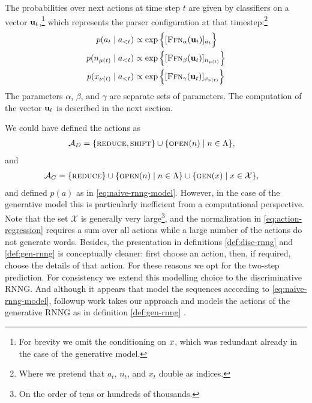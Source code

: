     The probabilities over next actions at time step $t$ are given by classifiers on a vector $\mathbf{u}_t$,\footnote{For brevity we omit the conditioning on $x$, which was redundant already in the case of the generative model.} which represents the parser configuration at that timestep:\footnote{Where we pretend that $a_t$, $n_t$, and $x_t$ double as indices.}
    \begin{align}
      p(a_t \mid a_{<t})
        &\propto \exp \Big\{ [\textsc{Ffn}_{\alpha}( \mathbf{u}_t )]_{a_t}  \Big\}  \\
      p(n_{\mu(t)} \mid a_{<t})
        &\propto \exp \Big\{ [\textsc{Ffn}_{\beta}( \mathbf{u}_t )]_{n_{\mu(t)}}  \Big\}  \\
      p(x_{\nu(t)} \mid a_{<t})
        &\propto \exp \Big\{ [\textsc{Ffn}_{\gamma}( \mathbf{u}_t )]_{x_{\nu(t)}}  \Big\}
      \label{eq:action-regression}
    \end{align}
    The parameters $\alpha$, $\beta$, and $\gamma$ are separate sets of parameters. The computation of the vector $\mathbf{u}_t$ is described in the next section.

    \begin{remark} We could have defined the actions as
      \begin{align*}
        \mathcal{A}_D &= \{ \textsc{reduce}, \textsc{shift} \} \cup \{ \textsc{open}(n) \mid n \in \Lambda \},
      \end{align*}
      and
      \begin{align*}
        \mathcal{A}_G &= \{ \textsc{reduce} \} \cup \{ \textsc{open}(n) \mid n \in \Lambda \} \cup \{ \textsc{gen}(x) \mid x \in \mathcal{X} \},
      \end{align*}
      and defined $p(a)$ as in \ref{eq:naive-rnng-model}. However, in the case of the generative model this is particularly inefficient from a computational perspective. Note that the set $\mathcal{X}$ is generally very large\footnote{On the order of tens or hundreds of thousands.}, and the normalization in \ref{eq:action-regression} requires a sum over all actions while a large number of the actions do not generate words. Besides, the presentation in definitions \ref{def:disc-rnng} and \ref{def:gen-rnng} is conceptually cleaner: first choose an action, then, if required, choose the details of that action. For these reasons we opt for the two-step prediction. For consistency we extend this modelling choice to the discriminative RNNG. And although it appears that \citet{dyer2016rnng} model the sequences according to \ref{eq:naive-rnng-model}, followup work takes our approach and models the actions of the generative RNNG as in definition \ref{def:gen-rnng} \citep{hale2018beam}.
    \end{remark}


